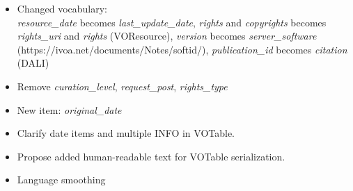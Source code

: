 \documentclass[11pt,a4paper]{ivoa}
\begin{document}
\begin{itemize}
\item Changed vocabulary: \\
  \textit{resource\_date} becomes \textit{last\_update\_date},
  \textit{rights} and \textit{copyrights} becomes \textit{rights\_uri} and \textit{rights} (VOResource),
  \textit{version} becomes \textit{server\_software} (https://ivoa.net/documents/Notes/softid/),
  \textit{publication\_id} becomes \textit{citation} (DALI)
\item Remove \textit{curation\_level}, \textit{request\_post}, \textit{rights\_type}
\item New item: \textit{original\_date}
\item Clarify date items and multiple INFO in VOTable.
\item Propose added human-readable text for VOTable serialization.
\item Language smoothing 
\end{itemize}


\end{document}

